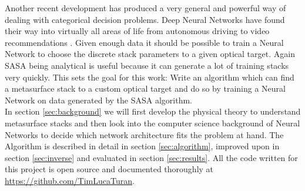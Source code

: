\indent
Another recent development has produced a very general and powerful way of dealing with categorical decision problems. Deep Neural Networks have found their way into virtually all areas of life from autonomous driving \cite{Dequaire2016} to video recommendations \cite{youtube}. Given enough data it should be possible to train a Neural Network to choose the discrete stack parameters to a given optical target. Again SASA being analytical is useful because it can generate a lot of training stacks very quickly. This sets the goal for this work: Write an algorithm which can find a metasurface stack to a custom optical target and do so by training a Neural Network on data generated by the SASA algorithm.
\\

\indent
In section \ref{sec:background} we will first develop the physical theory to understand metasurface stacks and then look into the computer science background of Neural Networks to decide which network architecture fits the problem at hand. The Algorithm is described in detail in section \ref{sec:algorithm}, improved upon in section \ref{sec:inverse} and evaluated in section \ref{sec:results}.
All the code written for this project is open source and documented thoroughly at \url{https://github.com/TimLucaTuran}.
